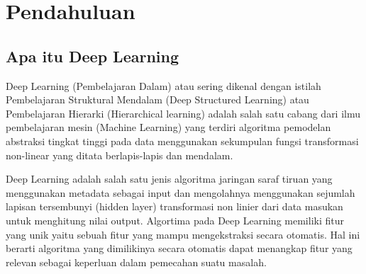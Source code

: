 \section{Pendahuluan}
\subsection{Apa itu Deep Learning}
Deep Learning (Pembelajaran Dalam) atau sering dikenal dengan istilah Pembelajaran Struktural Mendalam (Deep Structured Learning) atau Pembelajaran Hierarki (Hierarchical learning) adalah salah satu cabang dari ilmu pembelajaran mesin (Machine Learning) yang terdiri algoritma pemodelan abstraksi tingkat tinggi pada data menggunakan sekumpulan fungsi transformasi non-linear yang ditata berlapis-lapis dan mendalam. \par

Deep Learning adalah salah satu jenis algoritma jaringan saraf tiruan yang menggunakan metadata sebagai input dan mengolahnya menggunakan sejumlah lapisan tersembunyi (hidden layer) transformasi non linier dari data masukan untuk menghitung nilai output. Algortima pada Deep Learning memiliki fitur yang unik yaitu sebuah fitur yang mampu mengekstraksi secara otomatis. Hal ini berarti algoritma yang dimilikinya secara otomatis dapat menangkap fitur yang relevan sebagai keperluan dalam pemecahan suatu masalah. \par


